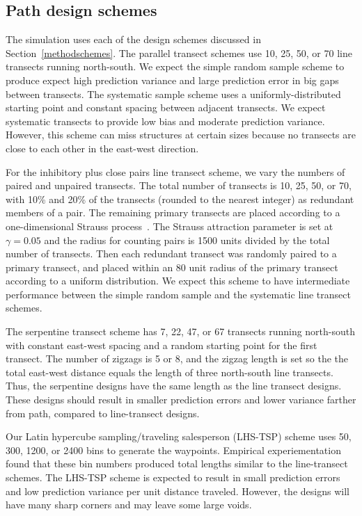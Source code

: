 \documentclass[review]{elsarticle}
\begin{document}
\subsection{Path design schemes}

The simulation uses each of the design schemes discussed in
Section~\ref{methodschemes}. The parallel transect schemes use 10,
25, 50, or 70 line transects running north-south. We expect the
simple random sample scheme to produce expect high prediction variance and
large prediction error in big gaps between transects. The systematic sample
scheme uses a uniformly-distributed starting point and constant spacing between
adjacent transects. We expect systematic transects to provide low bias and
moderate prediction variance. However, this scheme can miss structures at
certain sizes because no transects are close to each other in the east-west
direction.

For the inhibitory plus close pairs line transect scheme, we vary the numbers of
paired and unpaired transects. The total number of transects is 10, 25, 50, or
70, with 10\% and 20\% of the transects (rounded to the nearest integer) as
redundant members of a pair. The remaining primary transects are placed
according to a one-dimensional Strauss process~\citep{strauss,kellyripley}. The
Strauss attraction parameter is set at \(\gamma = 0.05\) and the radius for
counting pairs is 1500 units divided by the total number of transects. Then
each redundant transect was randomly paired to a primary transect, and placed
within an 80 unit radius of the primary transect according to a uniform
distribution. We expect this scheme to have intermediate performance between
the simple random sample and the systematic line transect schemes.

The serpentine transect scheme has 7, 22, 47, or 67 transects running
north-south with constant east-west spacing and a random starting point for the
first transect. The number of zigzags is 5 or 8, and the zigzag length is set
so the the total east-west distance equals the length of three north-south line
transects. Thus, the serpentine designs have the same length as the line
transect designs. These designs should result in smaller prediction errors and
lower variance farther from path, compared to line-transect designs.

Our Latin hypercube sampling/traveling salesperson (LHS-TSP) scheme uses 50,
300, 1200, or 2400 bins to generate the waypoints. Empirical experiementation
found that these bin numbers produced total lengths similar to the
line-transect schemes. The LHS-TSP scheme is expected to result in small
prediction errors and low prediction variance per unit distance traveled.
However, the designs will have many sharp corners and may leave some large
voids.
\end{document}
